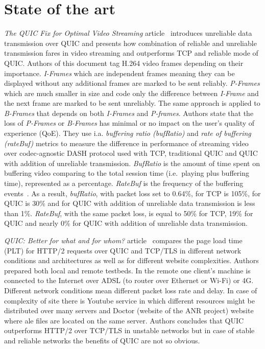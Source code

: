 \section{State of the art}
\label{sec:state-of-the-art}

\textit{The QUIC Fix for Optimal Video Streaming} article~\cite{the-quic-fix-for-optimal-video-streaming} introduces unreliable data transmission over QUIC and presents how combination of reliable and unreliable transmission fares in video streaming and outperforms TCP and reliable mode of QUIC\@.
Authors of this document tag H.264 video frames depending on their importance.
\textit{I-Frames} which are independent frames meaning they can be displayed without any additional frames are marked to be sent reliably.
\textit{P-Frames} which are much smaller in size and code only the difference between \textit{I-Frame} and the next frame are marked to be sent unreliably.
The same approach is applied to \textit{B-Frames} that depends on both \textit{I-Frames} and \textit{P-frames}.
Authors state that the loss of \textit{P-Frames} or \textit{B-Frames} has minimal or no impact on the user's quality of experience (QoE).
They use i.a. \textit{buffering ratio (bufRatio)} and \textit{rate of buffering (rateBuf)} metrics to measure the difference in performance of streaming video over codec-agnostic DASH protocol used with TCP, traditional QUIC and QUIC with addition of unreliable transmission.
\textit{BufRatio} is the amount of time spent on buffering video comparing to the total session time (i.e.\ playing plus buffering time), represented as a percentage.
\textit{RateBuf} is the frequency of the buffering events~\cite{impact-of-video-quality-on-user-engagement}.
As a result, \textit{bufRatio}, with packet loss set to 0.64\%, for TCP is 105\%, for QUIC is 30\% and for QUIC with addition of unreliable data transmission is less than 1\%.
\textit{RateBuf}, with the same packet loss, is equal to 50\% for TCP, 19\% for QUIC and nearly 0\% for QUIC with addition of unreliable data transmission.

\textit{QUIC: Better for what and for whom?} article~\cite{quic-better-for-what-and-for-whom} compares the page load time (PLT) for HTTP/2 requests over QUIC and TCP/TLS in different network conditions and architectures as well as for different website complexities.
Authors prepared both local and remote testbeds.
In the remote one client's machine is connected to the Internet over ADSL (to router over Ethernet or Wi-Fi) or 4G\@.
Different network conditions mean different packet loss rate and delay.
In case of complexity of site there is Youtube service in which different resources might be distributed over many servers and Doctor (website of the ANR project) website where ale files are located on the same server.
Authors concludes that QUIC outperforms HTTP/2 over TCP/TLS in unstable networks but in case of stable and reliable networks the benefits of QUIC are not so obvious.

